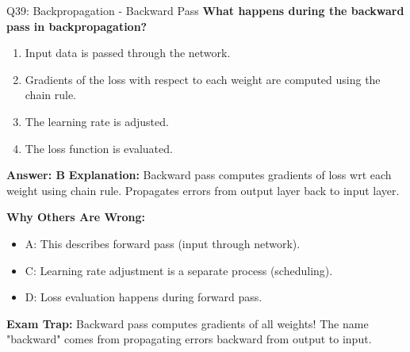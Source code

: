 \documentclass[8pt]{beamer}
\begin{document}
	\begin{frame}{Q39: Backpropagation - Backward Pass}
		\fontsize{6.5}{7.5}\selectfont
		\textbf{What happens during the backward pass in backpropagation?}
		
		\begin{enumerate}
			\item Input data is passed through the network.
			\item Gradients of the loss with respect to each weight are computed using the chain rule.
			\item The learning rate is adjusted.
			\item The loss function is evaluated.
		\end{enumerate}
		
		\vspace{0.05cm}
		\textcolor{myblue}{\textbf{Answer: B}}
		\vspace{0.05cm}
		\textcolor{myblue}{\textbf{Explanation:}} Backward pass computes gradients of loss wrt each weight using chain rule. Propagates errors from output layer back to input layer.
		
		\vspace{0.05cm}
		\textcolor{myred}{\textbf{Why Others Are Wrong:}}
		\begin{itemize}
			\item \textcolor{myred}{A:} This describes forward pass (input through network).
			\item \textcolor{myred}{C:} Learning rate adjustment is a separate process (scheduling).
			\item \textcolor{myred}{D:} Loss evaluation happens during forward pass.
		\end{itemize}
		
		\textcolor{myred}{\textbf{Exam Trap:}} Backward pass computes \textcolor{myblue}{gradients} of all weights! The name "backward" comes from propagating errors backward from output to input.
	\end{frame}
	
\end{document}
